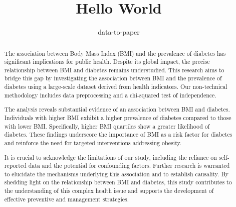 \documentclass[12pt]{article}
\title{Hello World}
\author{data-to-paper}
\begin{document}
\maketitle

\begin{abstract}
The association between Body Mass Index (BMI) and the prevalence of diabetes has significant implications for public health. Despite its global impact, the precise relationship between BMI and diabetes remains understudied. This research aims to bridge this gap by investigating the association between BMI and the prevalence of diabetes using a large-scale dataset derived from health indicators. Our non-technical methodology includes data preprocessing and a chi-squared test of independence.

The analysis reveals substantial evidence of an association between BMI and diabetes. Individuals with higher BMI exhibit a higher prevalence of diabetes compared to those with lower BMI. Specifically, higher BMI quartiles show a greater likelihood of diabetes. These findings underscore the importance of BMI as a risk factor for diabetes and reinforce the need for targeted interventions addressing obesity.

It is crucial to acknowledge the limitations of our study, including the reliance on self-reported data and the potential for confounding factors. Further research is warranted to elucidate the mechanisms underlying this association and to establish causality. By shedding light on the relationship between BMI and diabetes, this study contributes to the understanding of this complex health issue and supports the development of effective preventive and management strategies.
\end{abstract}
\end{document}
